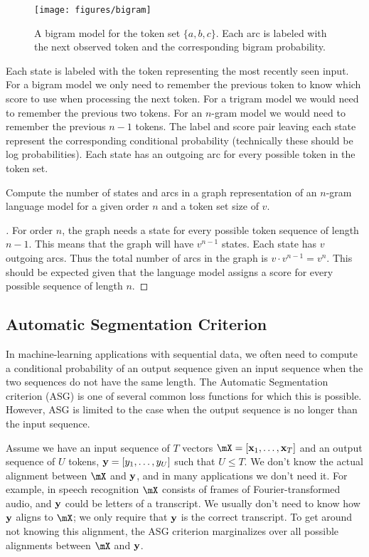 \begin{figure}
    \centering
    \texttt{[image: figures/bigram]}
    \caption{A bigram model for the token set $\{a, b, c\}$. Each arc is
    labeled with the next observed token and the corresponding bigram
    probability.}
    \label{fig:bigram}
\end{figure}

Each state is labeled with the token representing the most recently seen input.
For a bigram model we only need to remember the previous token to know which
score to use when processing the next token. For a trigram model we would need
to remember the previous two tokens. For an $n$-gram model we would need to
remember the previous $n-1$ tokens. The label and score pair leaving each state
represent the corresponding conditional probability (technically these should
be log probabilities). Each state has an outgoing arc for every possible token
in the token set.

\begin{example}
\label{ex:ngram}
Compute the number of states and arcs in a graph representation of an $n$-gram
language model for a given order $n$ and a token set size of $v$.
\end{example}

\begin{proof}[\unskip\nopunct]
For order $n$, the graph needs a state for every possible token sequence of
length $n-1$. This means that the graph will have $v^{n-1}$ states. Each state
has $v$ outgoing arcs. Thus the total number of arcs in the graph is $v \cdot
v^{n-1}= v^n$. This should be expected given that the language model assigns a
score for every possible sequence of length $n$.
\end{proof}

\subsection{Automatic Segmentation Criterion}

In machine-learning applications with sequential data, we often need to compute
a conditional probability of an output sequence given an input sequence when
the two sequences do not have the same length. The Automatic Segmentation
criterion (ASG) is one of several common loss functions for which this is
possible. However, ASG is limited to the case when the output sequence is no
longer than the input sequence.

Assume we have an input sequence of $T$ vectors $\mX = [\vx_1, \ldots, \vx_T]$
and an output sequence of $U$ tokens, ${\bf y} = [y_1, \ldots, y_U]$ such that $U
\le T$. We don't know the actual alignment between $\mX$ and ${\bf y}$, and in many
applications we don't need it. For example, in speech recognition $\mX$
consists of frames of Fourier-transformed audio, and ${\bf y}$ could be letters of
a transcript. We usually don't need to know how ${\bf y}$ aligns to $\mX$; we only
require that ${\bf y}$ is the correct transcript. To get around not knowing this
alignment, the ASG criterion marginalizes over all possible alignments between
$\mX$ and ${\bf y}$.

